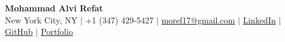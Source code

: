 \begin{center}
  {\Huge\bfseries Mohammad Alvi Refat}\\[4pt]
  \small
  New York City, NY
  \quad $|$ \quad
  +1 (347) 429-5427
  \quad $|$ \quad
  \href{mailto:moref17@gmail.com}{moref17@gmail.com}
  \quad $|$ \quad
  \href{https://www.linkedin.com/in/mohammad-refat/}{LinkedIn}
  \quad $|$ \quad
  \href{https://github.com/MohammadRefat23}{GitHub}
  \quad $|$ \quad
  \href{https://mohammadrefat23.github.io/}{Portfolio}
\end{center}
